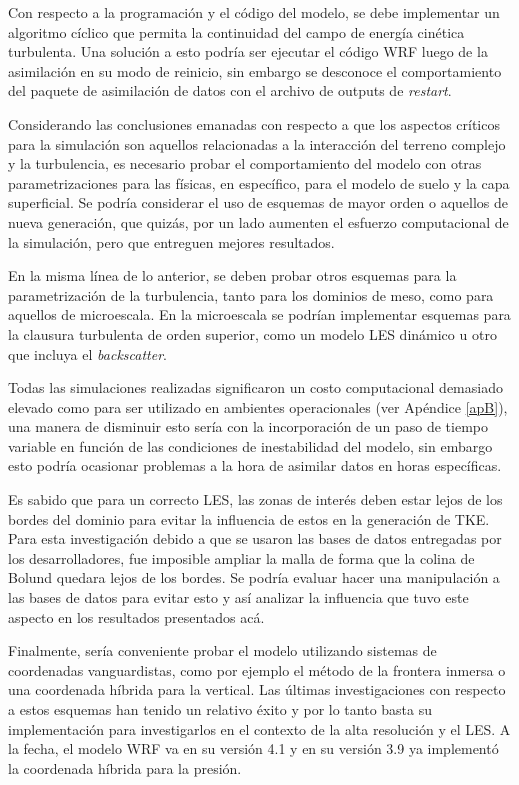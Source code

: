 \begin{itemize*}
	\item Con respecto a la programación y el código del modelo, se debe implementar un algoritmo cíclico que permita la continuidad del campo de energía cinética turbulenta. Una solución a esto podría ser ejecutar el código WRF luego de la asimilación en su modo de reinicio, sin embargo se desconoce el comportamiento del paquete de asimilación de datos con el archivo de outputs de \emph{restart}.
	\item Considerando las conclusiones emanadas con respecto a que los aspectos críticos para la simulación son aquellos relacionadas a la interacción del terreno complejo y la turbulencia, es necesario probar el comportamiento del modelo con otras parametrizaciones para las físicas, en específico, para el modelo de suelo y la capa superficial. Se podría considerar el uso de esquemas de mayor orden o aquellos de nueva generación, que quizás, por un lado aumenten el esfuerzo computacional de la simulación, pero que entreguen mejores resultados.
	\item En la misma línea de lo anterior, se deben probar otros esquemas para la parametrización de la turbulencia, tanto para los dominios de meso, como para aquellos de microescala. En la microescala se podrían implementar esquemas para la clausura turbulenta de orden superior, como un modelo LES dinámico u otro que incluya el \emph{backscatter}.
	\item Todas las simulaciones realizadas significaron un costo computacional demasiado elevado como para ser utilizado en ambientes operacionales (ver Apéndice \ref{apB}), una manera de disminuir esto sería con la incorporación de un paso de tiempo variable en función de las condiciones de inestabilidad del modelo, sin embargo esto podría ocasionar problemas a la hora de asimilar datos en horas específicas.
	\item Es sabido que para un correcto LES, las zonas de interés deben estar lejos de los bordes del dominio para evitar la influencia de estos en la generación de TKE. Para esta investigación debido a que se usaron las bases de datos entregadas por los desarrolladores, fue imposible ampliar la malla de forma que la colina de Bolund quedara lejos de los bordes. Se podría evaluar hacer una manipulación a las bases de datos para evitar esto y así analizar la influencia que tuvo este aspecto en los resultados presentados acá.
	\item Finalmente, sería conveniente probar el modelo utilizando sistemas de coordenadas vanguardistas, como por ejemplo el método de la frontera inmersa o una coordenada híbrida para la vertical. Las últimas investigaciones con respecto a estos esquemas han tenido un relativo éxito y por lo tanto basta su implementación para investigarlos en el contexto de la alta resolución y el LES. A la fecha, el modelo WRF va en su versión 4.1 y en su versión 3.9 ya implementó la coordenada híbrida para la presión.
\end{itemize*}
\newpage
